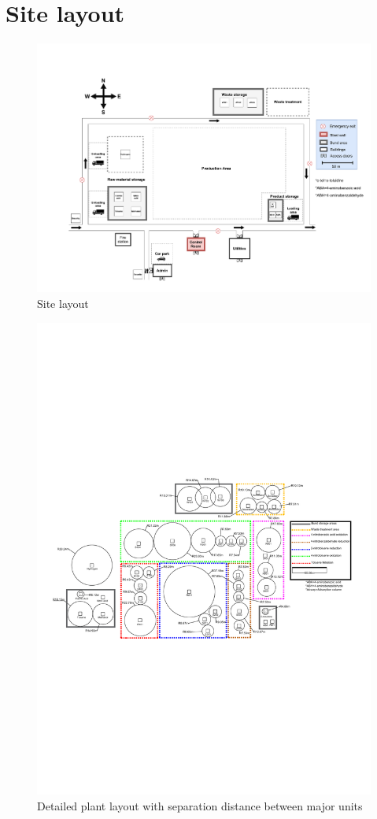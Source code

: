\section{Site layout}

\begin{figure}[H]
    \centering
    \includegraphics[width=\linewidth]{chapters/Z-support/figures/Plant layout 3.pdf}
    \caption{Site layout}
    \label{fig:site}
\end{figure}

\begin{figure}[H]
    \centering
    \includegraphics[width=\linewidth]{chapters/Z-support/figures/Separation distances-Model.pdf}
    \caption{Detailed plant layout with separation distance between major units}
    \label{fig:detailed_layout}
\end{figure}
